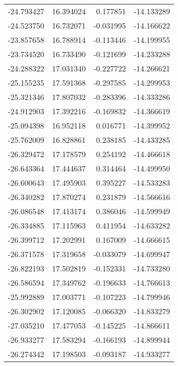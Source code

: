 \begin{tabular}{rrrr}
      -24.793427 &        16.394024 &    0.177851 & -14.133289 \\
      -24.523750 &        16.732071 &   -0.031995 & -14.166622 \\
      -23.857658 &        16.788914 &   -0.113446 & -14.199955 \\
      -23.734520 &        16.733490 &   -0.121699 & -14.233288 \\
      -24.288322 &        17.031340 &   -0.227722 & -14.266621 \\
      -25.155235 &        17.591368 &   -0.297585 & -14.299953 \\
      -25.321346 &        17.807032 &   -0.283396 & -14.333286 \\
      -24.912903 &        17.392216 &   -0.169832 & -14.366619 \\
      -25.094398 &        16.952118 &    0.016771 & -14.399952 \\
      -25.762009 &        16.828861 &    0.238185 & -14.433285 \\
      -26.329472 &        17.178579 &    0.254192 & -14.466618 \\
      -26.643364 &        17.444637 &    0.314464 & -14.499950 \\
      -26.600643 &        17.495903 &    0.395227 & -14.533283 \\
      -26.340282 &        17.870274 &    0.231879 & -14.566616 \\
      -26.086548 &        17.413174 &    0.386046 & -14.599949 \\
      -26.334885 &        17.115963 &    0.411954 & -14.633282 \\
      -26.399712 &        17.202991 &    0.167009 & -14.666615 \\
      -26.371578 &        17.319658 &   -0.033079 & -14.699947 \\
      -26.822193 &        17.502819 &   -0.152331 & -14.733280 \\
      -26.586594 &        17.349762 &   -0.196633 & -14.766613 \\
      -25.992889 &        17.003771 &   -0.107223 & -14.799946 \\
      -26.302902 &        17.120085 &   -0.066320 & -14.833279 \\
      -27.035210 &        17.477053 &   -0.145225 & -14.866611 \\
      -26.933277 &        17.583294 &   -0.166193 & -14.899944 \\
      -26.274342 &        17.198503 &   -0.093187 & -14.933277 \\

\end{tabular}
